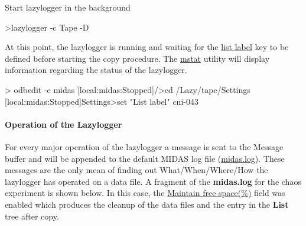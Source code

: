 \begin{DoxyEnumerate}
\item Start lazylogger in the background 
\begin{DoxyCode}
>lazylogger -c Tape -D
\end{DoxyCode}
 
\item At this point, the lazylogger is running and waiting for the \hyperlink{F_LogUtil_F_Lazy_list_label}{list label} key to be defined before starting the copy procedure. The \hyperlink{RC_Monitor_RC_mstat_utility}{mstat} utility will display information regarding the status of the lazylogger. 
\begin{DoxyCode}
> odbedit -e midas
[local:midas:Stopped]/>cd /Lazy/tape/Settings
[local:midas:Stopped]Settings>set "List label" cni-043
\end{DoxyCode}


\par


\par



\end{DoxyEnumerate}\hypertarget{F_LogUtil_F_ODB_Lazy_operation}{}\paragraph{Operation of the Lazylogger}\label{F_LogUtil_F_ODB_Lazy_operation}
For every major operation of the lazylogger a message is sent to the Message buffer and will be appended to the default MIDAS log file (\hyperlink{F_Messaging_F_Log_File}{midas.log}). These messages are the only mean of finding out What/When/Where/How the lazylogger has operated on a data file. A fragment of the {\bfseries midas.log} for the chaos experiment is shown below. In this case, the \hyperlink{F_LogUtil_F_Lazy_maintain_free_space}{Maintain free space(\%)} field was enabled which produces the cleanup of the data files and the entry in the {\bfseries List} tree after copy. 
